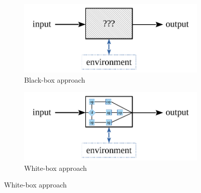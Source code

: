 \begin{figure}[H]
  \vspace{-3mm}
  \centering
  \begin{subfigure}{.5\textwidth}
    \centering
    \includegraphics[width=0.9\linewidth]{images/blackbox} 
    \caption{Black-box approach}
  \end{subfigure}%
  \begin{subfigure}{.5\textwidth}
    \centering
    \includegraphics[width=0.9\linewidth]{images/whitebox} 
    \caption{White-box approach}
  \end{subfigure}
  \vspace{-3mm}
\end{figure}

